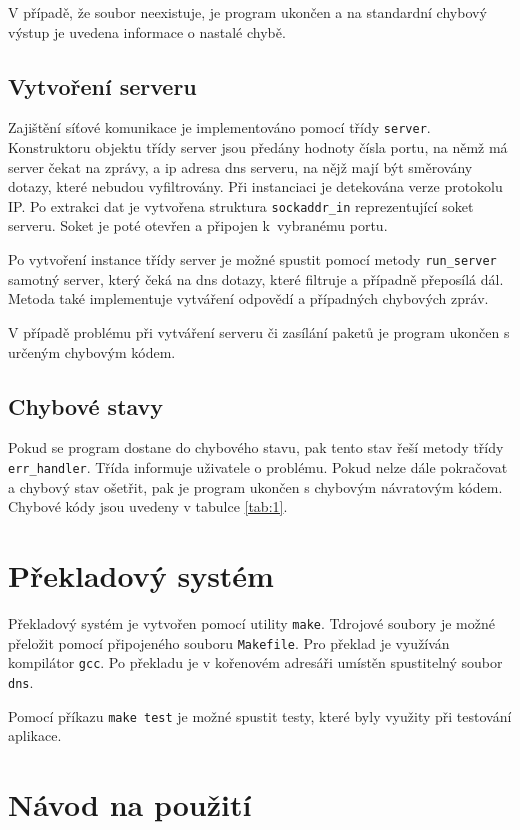 \documentclass[a4paper, 11pt]{article}
\begin{document}
	V případě, že soubor neexistuje, je program ukončen a na standardní chybový výstup je uvedena informace o nastalé chybě. 
	
	\subsection{Vytvoření serveru}
	Zajištění síťové komunikace je implementováno pomocí třídy \texttt{server}. Konstruktoru objektu třídy server jsou předány hodnoty čísla portu, na němž má server čekat na zprávy, a ip adresa dns serveru, na nějž mají být směrovány dotazy, které nebudou vyfiltrovány. 
	Při instanciaci je detekována verze protokolu IP. Po extrakci dat je vytvořena struktura \texttt{sockaddr\_in} reprezentující soket serveru. Soket je poté otevřen a připojen k~vybranému portu. 

	Po vytvoření instance třídy server je možné spustit pomocí metody \texttt{run\_server} samotný server, který čeká na dns dotazy, které filtruje a případně přeposílá dál. Metoda také implementuje vytváření odpovědí a případných chybových zpráv. 
	
	V případě problému při vytváření serveru či zasílání paketů je program ukončen s určeným chybovým kódem. 
	
	
	\subsection{Chybové stavy}
	Pokud se program dostane do chybového stavu, pak tento stav řeší metody třídy \texttt{err\_handler}. Třída informuje uživatele o problému. Pokud nelze dále pokračovat a chybový stav ošetřit, pak je program ukončen s chybovým návratovým kódem. Chybové kódy jsou uvedeny v tabulce \ref{tab:1}.
	
	\section{Překladový systém}
	Překladový systém je vytvořen pomocí utility \texttt{make}. Tdrojové soubory je možné přeložit pomocí připojeného souboru \texttt{Makefile}. Pro překlad je využíván kompilátor \texttt{gcc}. Po překladu je v kořenovém adresáři umístěn spustitelný soubor \texttt{dns}.
	
	Pomocí příkazu \texttt{make test} je možné spustit testy, které byly využity při testování aplikace. 
	
	\section{Návod na použití}
	
\end{document}
